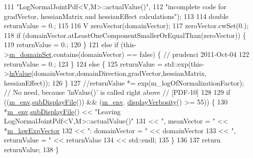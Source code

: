 \begin{DoxyCode}
111                       \textcolor{stringliteral}{"LogNormalJointPdf<V,M>::actualValue()"},
112                       \textcolor{stringliteral}{"incomplete code for gradVector, hessianMatrix and hessianEffect calculations"});
113 
114   \textcolor{keywordtype}{double} returnValue = 0.;
115 
116   V zeroVector(domainVector);
117   zeroVector.cwSet(0.);
118   \textcolor{keywordflow}{if} (domainVector.atLeastOneComponentSmallerOrEqualThan(zeroVector)) \{
119     returnValue = 0.;
120   \}
121   \textcolor{keywordflow}{else} \textcolor{keywordflow}{if} (this->\hyperlink{class_q_u_e_s_o_1_1_base_scalar_function_a67696e86211197938c72cd11863f5cf8}{m\_domainSet}.contains(domainVector) == \textcolor{keyword}{false}) \{ \textcolor{comment}{// prudenci 2011-Oct-04}
122     returnValue = 0.;
123   \}
124   \textcolor{keywordflow}{else} \{
125     returnValue = std::exp(this->\hyperlink{class_q_u_e_s_o_1_1_log_normal_joint_pdf_a9c31e89ee4abe8f1747e50c8d472a94d}{lnValue}(domainVector,domainDirection,gradVector,hessianMatrix,
      hessianEffect));
126   \}
127   \textcolor{comment}{//returnValue *= exp(m\_logOfNormalizationFactor); // No need, because 'lnValue()' is called right above
       // [PDF-10]}
128 
129   \textcolor{keywordflow}{if} ((\hyperlink{class_q_u_e_s_o_1_1_base_scalar_function_adf44141aeb765d97613286f88f235f04}{m\_env}.\hyperlink{class_q_u_e_s_o_1_1_base_environment_a8a0064746ae8dddfece4229b9ad374d6}{subDisplayFile}()) && (\hyperlink{class_q_u_e_s_o_1_1_base_scalar_function_adf44141aeb765d97613286f88f235f04}{m\_env}.
      \hyperlink{class_q_u_e_s_o_1_1_base_environment_a1fe5f244fc0316a0ab3e37463f108b96}{displayVerbosity}() >= 55)) \{
130     *\hyperlink{class_q_u_e_s_o_1_1_base_scalar_function_adf44141aeb765d97613286f88f235f04}{m\_env}.\hyperlink{class_q_u_e_s_o_1_1_base_environment_a8a0064746ae8dddfece4229b9ad374d6}{subDisplayFile}() << \textcolor{stringliteral}{"Leaving LogNormalJointPdf<V,M>::actualValue()"}
131                             << \textcolor{stringliteral}{", meanVector = "}   << *\hyperlink{class_q_u_e_s_o_1_1_log_normal_joint_pdf_a1373e1737c3198b852fab05c77abea35}{m\_lawExpVector}
132                             << \textcolor{stringliteral}{": domainVector = "} << domainVector
133                             << \textcolor{stringliteral}{", returnValue = "}  << returnValue
134                             << std::endl;
135   \}
136 
137   \textcolor{keywordflow}{return} returnValue;
138 \}
\end{DoxyCode}
